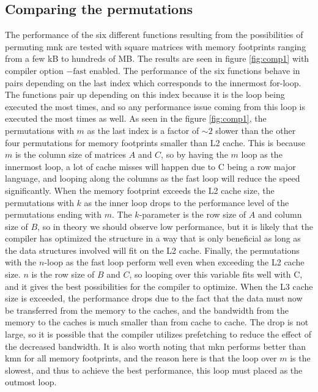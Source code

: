 \subsection{Comparing the permutations}
The performance of the six different functions resulting from the possibilities of permuting mnk are tested with square matrices with memory footprints ranging from a few kB to hundreds of MB. The results are seen in figure \ref{fig:comp1} with compiler option $\mathrm{-fast}$ enabled. The performance of the six functions behave in pairs depending on the last index which corresponds to the innermost for-loop. The functions pair up depending on this index because it is the loop being executed the most times, and so any performance issue coming from this loop is executed the most times as well. As seen in the figure \ref{fig:comp1}, the permutations with $m$ as the last index is a factor of $\sim 2$ slower than the other four permutations for memory footprints smaller than L2 cache. This is because $m$ is the column size of matrices $A$ and $C$, so by having the $m$ loop as the innermost loop, a lot of cache misses will happen due to C being a row major language, and looping along the columns as the fast loop will reduce the speed significantly. When the memory footprint exceeds the L2 cache size, the permutations with $k$ as the inner loop drops to the performance level of the permutations ending with $m$. The $k$-parameter is the row size of $A$ and column size of $B$, so in theory we should observe low performance, but it is likely that the compiler has optimized the structure in a way that is only beneficial as long as the data structures involved will fit on the L2 cache. Finally, the permutations with the $n$-loop as the fast loop perform well even when exceeding the L2 cache size. $n$ is the row size of $B$ and $C$, so looping over this variable fits well with C, and it gives the best possibilities for the compiler to optimize. When the L3 cache size is exceeded, the performance drops due to the fact that the data must now be transferred from the memory to the caches, and the bandwidth from the memory to the caches is much smaller than from cache to cache. The drop is not large, so it is possible that the compiler utilizes prefetching to reduce the effect of the decreased bandwidth. It is also worth noting that mkn performs better than kmn for all memory footprints, and the reason here is that the loop over $m$ is the slowest, and thus to achieve the best performance, this loop must placed as the outmost loop.

